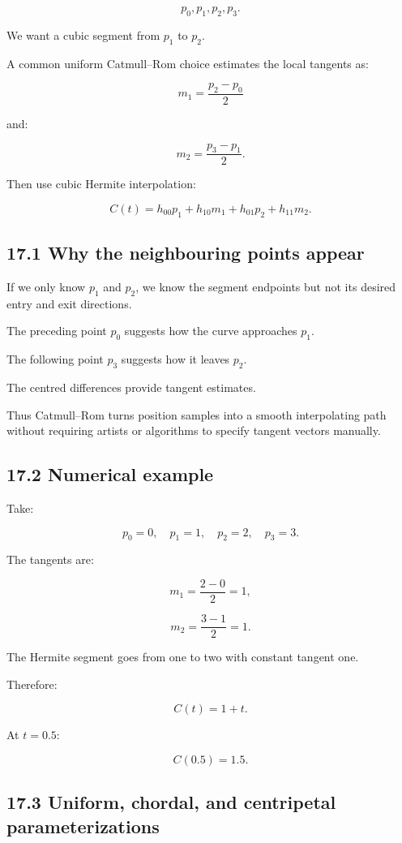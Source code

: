 \[ p_0,p_1,p_2,p_3. \]

We want a cubic segment from \(p_1\) to \(p_2\).

A common uniform Catmull--Rom choice estimates the local tangents as:

\[ \boxed{ m_1=\frac{p_2-p_0}{2} } \]

and:

\[ \boxed{ m_2=\frac{p_3-p_1}{2} }. \]

Then use cubic Hermite interpolation:

\[ \boxed{ C(t)= h_{00}p_1+ h_{10}m_1+ h_{01}p_2+ h_{11}m_2 }. \]

\subsection{17.1 Why the neighbouring points appear}\label{02-foundations-ii-ch028-why-the-neighbouring-points-appear}

If we only know \(p_1\) and \(p_2\), we know the segment endpoints but not its desired entry and exit directions.

The preceding point \(p_0\) suggests how the curve approaches \(p_1\).

The following point \(p_3\) suggests how it leaves \(p_2\).

The centred differences provide tangent estimates.

Thus Catmull--Rom turns position samples into a smooth interpolating path without requiring artists or algorithms to specify tangent vectors manually.

\subsection{17.2 Numerical example}\label{02-foundations-ii-ch028-numerical-example-1}

Take:

\[ p_0=0,\quad p_1=1,\quad p_2=2,\quad p_3=3. \]

The tangents are:

\[ m_1=\frac{2-0}{2}=1, \]

\[ m_2=\frac{3-1}{2}=1. \]

The Hermite segment goes from one to two with constant tangent one.

Therefore:

\[ \boxed{C(t)=1+t}. \]

At \(t=0.5\):

\[ \boxed{C(0.5)=1.5}. \]

\subsection{17.3 Uniform, chordal, and centripetal parameterizations}\label{02-foundations-ii-ch028-uniform-chordal-and-centripetal-parameterizations}


